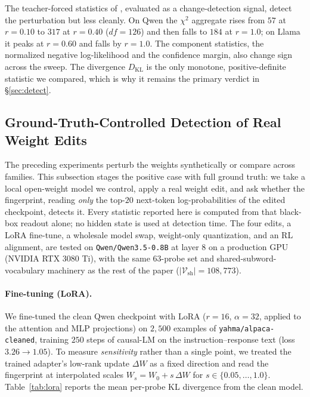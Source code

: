 \documentclass[11pt]{article}
\newcommand{\Vsh}{\mathcal{V}_{\mathrm{sh}}}
\theoremstyle{definition}
\begin{document}
The teacher-forced statistics of \citet{rpi}, evaluated as a change-detection
signal, detect the perturbation but less cleanly. On Qwen the $\chi^2$ aggregate
rises from $57$ at $r=0.10$ to $317$ at $r=0.40$ ($df=126$) and then falls to
$184$ at $r=1.0$; on Llama it peaks at $r=0.60$ and falls by $r=1.0$. The
component statistics, the normalized negative log-likelihood and the confidence
margin, also change sign across the sweep. The divergence $D_{\mathrm{KL}}$ is
the only monotone, positive-definite statistic we compared, which is why it
remains the primary verdict in \S\ref{sec:detect}.

\subsection{Ground-Truth-Controlled Detection of Real Weight Edits}
\label{sec:mods}

The preceding experiments perturb the weights synthetically or compare across
families. This subsection stages the positive case with full ground truth: we
take a local open-weight model we control, apply a real weight edit, and ask
whether the fingerprint, reading \emph{only} the top-$20$ next-token
log-probabilities of the edited checkpoint, detects it. Every statistic reported
here is computed from that black-box readout alone; no hidden state is used at
detection time. The four edits, a LoRA fine-tune, a wholesale model swap,
weight-only quantization, and an RL alignment, are tested on
\texttt{Qwen/Qwen3.5-0.8B} at layer $8$ on a production GPU (NVIDIA RTX 3080 Ti),
with the same $63$-probe set and shared-subword-vocabulary machinery as the
rest of the paper ($|\Vsh|=108{,}773$).

\paragraph{Fine-tuning (LoRA).}
We fine-tuned the clean Qwen checkpoint with LoRA ($r=16$, $\alpha=32$, applied
to the attention and MLP projections) on $2{,}500$ examples of
\texttt{yahma/alpaca-cleaned}, training $250$ steps of causal-LM on the
instruction--response text (loss $3.26 \to 1.05$). To measure \emph{sensitivity}
rather than a single point, we treated the trained adapter's low-rank update
$\Delta W$ as a fixed direction and read the fingerprint at interpolated scales
$W_s = W_0 + s\,\Delta W$ for $s \in \{0.05,\dots,1.0\}$.
Table~\ref{tab:lora} reports the mean per-probe KL divergence from the clean
model.
\end{document}
